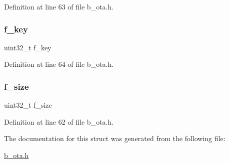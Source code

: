 Definition at line 63 of file b\+\_\+ota.\+h.

\mbox{\label{structb_o_t_a___f_w_info__t_a3835e475bd5101f82d3f66e02a3cee73}} 
\subsubsection{\texorpdfstring{f\+\_\+key}{f\_key}}
{\footnotesize\ttfamily uint32\+\_\+t f\+\_\+key}



Definition at line 64 of file b\+\_\+ota.\+h.

\mbox{\label{structb_o_t_a___f_w_info__t_a2ca16b35ded07b71a04f638169e07719}} 
\subsubsection{\texorpdfstring{f\+\_\+size}{f\_size}}
{\footnotesize\ttfamily uint32\+\_\+t f\+\_\+size}



Definition at line 62 of file b\+\_\+ota.\+h.



The documentation for this struct was generated from the following file\+:\begin{DoxyCompactItemize}
\item 
\mbox{\hyperlink{b__ota_8h}{b\+\_\+ota.\+h}}\end{DoxyCompactItemize}
